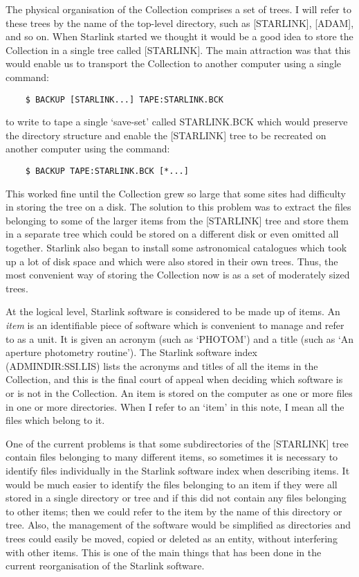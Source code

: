 The physical organisation of the Collection comprises a set of trees.
I will refer to these trees by the name of the top-level directory, such as
[STARLINK], [ADAM], and so on.
When Starlink started we thought it would be a good idea to store the Collection
in a single tree called [STARLINK].
The main attraction was that this would enable us to transport the Collection to
another computer using a single command:
\begin{verbatim}
    $ BACKUP [STARLINK...] TAPE:STARLINK.BCK
\end{verbatim}
to write to tape a single `save-set' called STARLINK.BCK which would preserve
the directory structure and enable the [STARLINK] tree to be recreated on
another computer using the command:
\begin{verbatim}
    $ BACKUP TAPE:STARLINK.BCK [*...]
\end{verbatim}
This worked fine until the Collection grew so large that some sites had
difficulty in storing the tree on a disk.
The solution to this problem was to extract the files belonging to some of the
larger items from the [STARLINK] tree and store them in a separate tree which
could be stored on a different disk or even omitted all together.
Starlink also began to install some astronomical catalogues which took up a
lot of disk space and which were also stored in their own trees.
Thus, the most convenient way of storing the Collection now is as a set of
moderately sized trees.

At the logical level, Starlink software is considered to be made up of items.
An {\em item} is an identifiable piece of software which is convenient to
manage and refer to as a unit.
It is given an acronym (such as `PHOTOM') and a title (such as `An aperture
photometry routine').
The Starlink software index \mbox{(ADMINDIR:SSI.LIS)} lists the acronyms and
titles of all the items in the Collection, and this is the final court of appeal
when deciding which software is or is not in the Collection.
An item is stored on the computer as one or more files in one or more
directories.
When I refer to an `item' in this note, I mean all the files which belong to
it.

One of the current problems is that some subdirectories of the [STARLINK]
tree contain files belonging to many different items, so sometimes it is
necessary to identify files individually in the Starlink software index when
describing items.
It would be much easier to identify the files belonging to an item if they
were all stored in a single directory or tree and if this did not contain any
files belonging to other items; then we could refer to the item by the name of
this directory or tree.
Also, the management of the software would be simplified as directories and
trees could easily be moved, copied or deleted as an entity, without interfering
with other items.
This is one of the main things that has been done in the current reorganisation
of the Starlink software.

